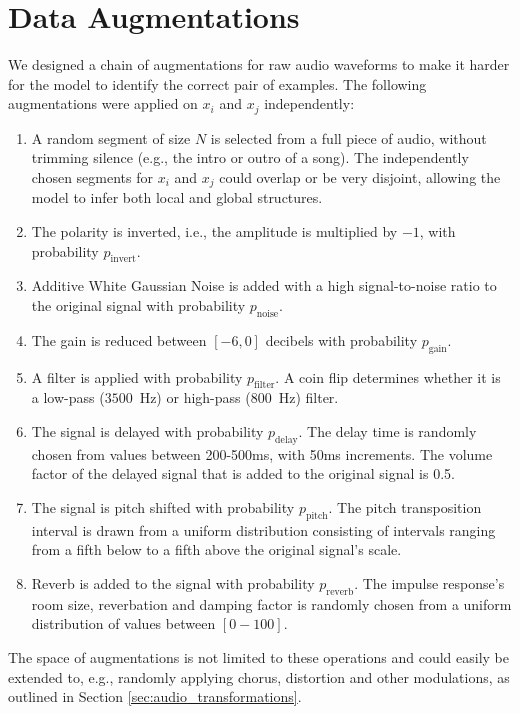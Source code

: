 \section{Data Augmentations}
We designed a chain of augmentations for raw audio waveforms to make it harder for the model to identify the correct pair of examples.
The following augmentations were applied on ${x_i}$ and ${x_j}$ independently:
\begin{enumerate}
    \item A random segment of size $N$ is selected from a full piece of audio, without trimming silence (e.g., the intro or outro of a song).
The independently chosen segments for $x_i$ and $x_j$ could overlap or be very disjoint, allowing the model to infer both local and global structures.
    \item The polarity is inverted, i.e., the amplitude is multiplied by $-1$, with probability $p_{\mathrm{invert}}$.
    \item Additive White Gaussian Noise is added with a high signal-to-noise ratio to the original signal with probability $p_{\mathrm{noise}}$.
    \item The gain is reduced between $[-6, 0]$ decibels with probability $p_{\mathrm{gain}}$.
    \item A filter is applied with probability $p_{\mathrm{filter}}$.
A coin flip determines whether it is a low-pass ($3500$~Hz) or high-pass ($800$~Hz) filter.
    \item The signal is delayed with probability $p_{\mathrm{delay}}$.
The delay time is randomly chosen from values between 200-500ms, with 50ms increments.
The volume factor of the delayed signal that is added to the original signal is 0.5.
    \item The signal is pitch shifted with probability $p_{\mathrm{pitch}}$.
The pitch transposition interval is drawn from a uniform distribution consisting of intervals ranging from a fifth below to a fifth above the original signal's scale.
    \item Reverb is added to the signal with probability $p_{\mathrm{reverb}}$.
The impulse response's room size, reverbation and damping factor is randomly chosen from a uniform distribution of values between $[0-100]$.
\end{enumerate}
The space of augmentations is not limited to these operations and could easily be extended to, e.g., randomly applying chorus, distortion and other modulations, as outlined in Section \ref{sec:audio_transformations}.



